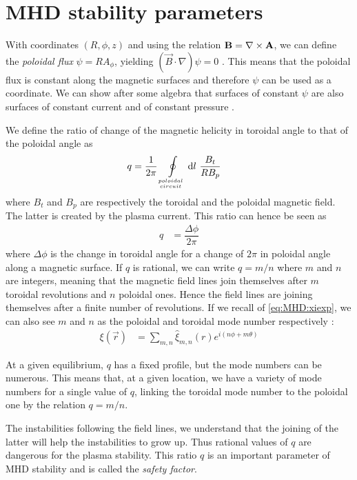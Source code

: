 \section{MHD stability parameters}\label{sec:MHD:qqs}
With coordinates $(R,\phi,z)$ and using the relation $\mathbf{B} = \nabla \times \mathbf{A}$, we can define the \emph{poloidal flux} $\psi = R A_{\phi}$, yielding $(\vec{B} \cdot \nabla) \psi = 0$ \cite{boyd-sanderson}. This means that the poloidal flux is constant along the magnetic surfaces and therefore $\psi$ can be used as a coordinate. We can show after some algebra that surfaces of constant $\psi$ are also surfaces of constant current and of constant pressure \cite{boyd-sanderson}.

We define the ratio of change of the magnetic helicity in toroidal angle to that of the poloidal angle as \cite{boyd-sanderson}
\begin{align}
	q & = \frac{1}{2 \pi} \oint\limits_{poloidal \atop circuit} \textrm{d} l\ \frac{B_t}{R B_p}   \label{eq:MHD:stab:q}
\end{align}
where $B_t$ and $B_p$ are respectively the toroidal and the poloidal magnetic field. The latter is created by the plasma current. This ratio can hence be seen as
\begin{align*}
	q & = \dfrac{\Delta \phi}{2 \pi}
\end{align*}
where $\Delta \phi$ is the change in toroidal angle for a change of $2 \pi$ in poloidal angle along a magnetic surface. If $q$ is rational, we can write $q = m / n$ where $m$ and $n$ are integers, meaning that the magnetic field lines join themselves after $m$ toroidal revolutions and $n$ poloidal ones. Hence the field lines are joining themselves after a finite number of revolutions. If we recall of \eqref{eq:MHD:xiexp}, we can also see $m$ and $n$ as the poloidal and toroidal mode number respectively \cite{gimblett2006}:
\begin{align*}
	\xi(\vec{r}) & = \sum_{m,n} \hat{\xi}_{m,n}(r) e^{ i ( n \phi + m \theta ) }
\end{align*}

At a given equilibrium, $q$ has a fixed profile, but the mode numbers can be numerous. This means that, at a given location, we have a variety of mode numbers for a single value of $q$, linking the toroidal mode number to the poloidal one by the relation $ q = m / n$.

The instabilities following the field lines, we understand that the joining of the latter will help the instabilities to grow up. Thus rational values of $q$ are dangerous for the plasma stability. This ratio $q$ is an important parameter of MHD stability and is called the \emph{safety factor}.


